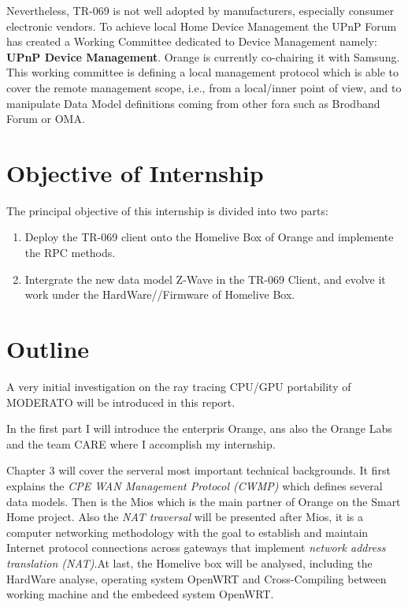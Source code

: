 Nevertheless, TR-069 is not well adopted by manufacturers, especially consumer electronic vendors. To achieve local Home Device Management the UPnP Forum has created a Working Committee dedicated to Device Management namely: \textbf{UPnP Device Management}. Orange is currently co-chairing it with Samsung. This working committee is defining a local management protocol which is able to cover the remote management scope, i.e., from a local/inner point of view, and to manipulate Data Model definitions coming from other fora such as Brodband Forum or OMA.
\section{Objective of Internship}

The principal objective of this internship is divided into two parts:
\begin{enumerate}
\it
\item Deploy the TR-069 client onto the Homelive Box of Orange and implemente the RPC methods.
\item Intergrate the new data model Z-Wave in the TR-069 Client, and evolve it work under the HardWare//Firmware of Homelive Box.
\end{enumerate}

\section{Outline}
A very initial investigation on the ray tracing CPU/GPU portability of MODERATO will be introduced in this report.

In the first part I will introduce the enterpris Orange, ans also the Orange Labs and the team CARE where I accomplish my internship.

Chapter 3 will cover the serveral most important technical backgrounds. It first explains the \textit{CPE WAN Management Protocol (CWMP)} which defines several data models. Then is the Mios which is the main partner of Orange on the Smart Home project. Also the \textit{NAT traversal} will be presented after Mios, it is a computer networking methodology with the goal to establish and maintain Internet protocol connections across gateways that implement \textit{network address translation (NAT)}.At last, the Homelive box will be analysed, including the HardWare analyse, operating system OpenWRT and Cross-Compiling between working machine and the embedeed system OpenWRT.

